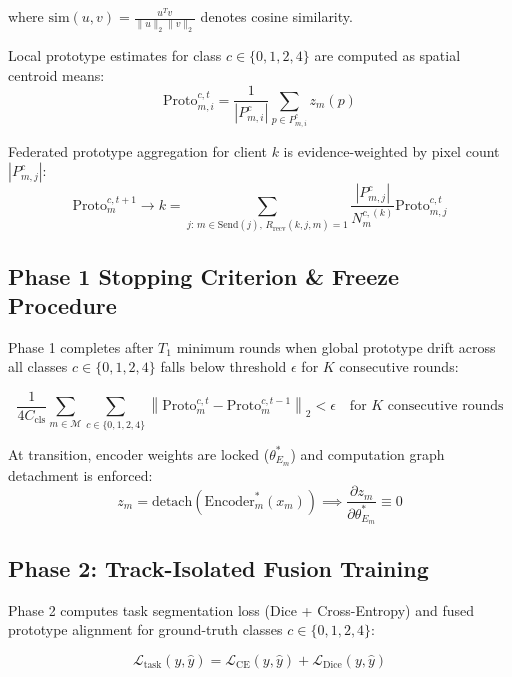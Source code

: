 \documentclass[11pt,a4paper]{article}
\begin{document}
where $\text{sim}(u, v) = \frac{u^T v}{\|u\|_2 \|v\|_2}$ denotes cosine similarity.

Local prototype estimates for class $c \in \{0,1,2,4\}$ are computed as spatial centroid means:
\begin{equation}
\text{Proto}_{m,i}^{c,t} = \frac{1}{|P_{m,i}^c|} \sum_{p \in P_{m,i}^c} z_m(p)
\end{equation}

Federated prototype aggregation for client $k$ is evidence-weighted by pixel count $|P_{m,j}^c|$:
\begin{equation}
\text{Proto}_m^{c, t+1} \to k = \sum_{j:\, m \in \text{Send}(j),\, R_{\text{recv}}(k,j,m)=1} \frac{|P_{m,j}^c|}{N_m^{c,(k)}} \text{Proto}_{m,j}^{c,t}
\end{equation}

\subsection{Phase 1 Stopping Criterion \& Freeze Procedure}

Phase 1 completes after $T_1$ minimum rounds when global prototype drift across all classes $c \in \{0,1,2,4\}$ falls below threshold $\epsilon$ for $K$ consecutive rounds:

\begin{equation}
\frac{1}{4 C_{\text{cls}}} \sum_{m \in \mathcal{M}} \sum_{c \in \{0,1,2,4\}} \left\| \text{Proto}_m^{c,t} - \text{Proto}_m^{c,t-1} \right\|_2 < \epsilon \quad \text{for } K \text{ consecutive rounds}
\end{equation}

At transition, encoder weights are locked ($\theta_{E_m}^*$) and computation graph detachment is enforced:
\begin{equation}
z_m = \text{detach}\left(\text{Encoder}_m^*(x_m)\right) \implies \frac{\partial z_m}{\partial \theta_{E_m}^*} \equiv 0
\end{equation}

\subsection{Phase 2: Track-Isolated Fusion Training}

Phase 2 computes task segmentation loss (Dice + Cross-Entropy) and fused prototype alignment for ground-truth classes $c \in \{0,1,2,4\}$:

\begin{equation}
\mathcal{L}_{\text{task}}(y, \hat{y}) = \mathcal{L}_{\text{CE}}(y, \hat{y}) + \mathcal{L}_{\text{Dice}}(y, \hat{y})
\end{equation}
\end{document}
